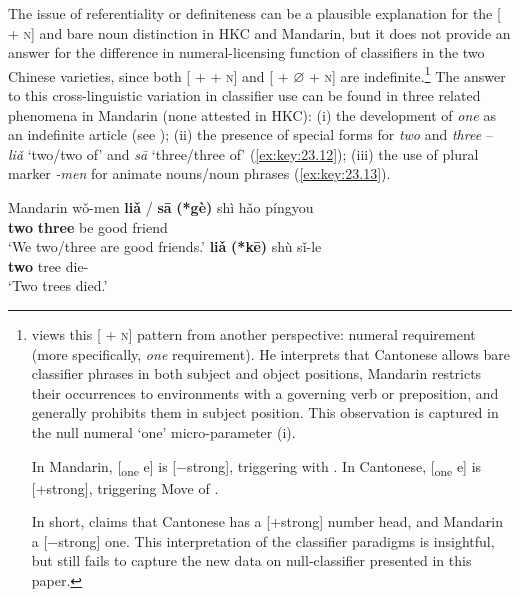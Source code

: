 \documentclass[output=paper]{langsci/langscibook}
\begin{document}
The issue of referentiality or definiteness can be a plausible explanation for
the [\Clf{} + \textsc{n}] and bare noun distinction in \gls{HKC} and Mandarin, but it
does not provide an answer for the difference in numeral-licensing function of
classifiers in the two Chinese varieties, since both [\Num{} + \Clf{} + \textsc{n}] and
[\Num{} + ${\varnothing}$ + \textsc{n}] are indefinite.\footnote{\citet{Huang2015} views
    this [\Clf{} + \textsc{n}] pattern from another perspective: numeral requirement
    (more specifically, \emph{one} requirement). He interprets that Cantonese
    allows bare classifier phrases in both subject and object positions,
    Mandarin restricts their occurrences to environments with a governing verb
    or preposition, and generally prohibits them in subject position. This
    observation is captured in the null numeral ‘one’ micro-parameter (i).

\begin{exe}
    \begin{xlist}
	\ex In Mandarin, [\textsubscript{one} e] is [−strong], triggering  with \Clf{}.
	\ex In Cantonese, [\textsubscript{one} e] is [+strong], triggering Move of \Clf{}.
    \end{xlist}
\end{exe}

In short, \citeauthor{Huang2015} claims that Cantonese has a [+strong] number
head, and Mandarin a [−strong] one. This interpretation of the classifier
paradigms is insightful, but still fails to capture the new data on
null-classifier  presented in this paper.} The answer to this
cross-linguistic variation in classifier use can be found in three related
phenomena in Mandarin (none attested in \gls{HKC}): (i) the development of
\emph{one} as an indefinite article (see ); (ii) the presence
of special forms for \emph{two} and \emph{three} -- \emph{liǎ} ‘two/two of’
and \emph{sā} ‘three/three of’ (\ref{ex:key:23.12}); (iii) the use of plural
marker \emph{-men} for animate nouns/noun phrases (\ref{ex:key:23.13}).

\ea\label{ex:key:23.12} Mandarin %
	\ea
        \gll    wǒ-men \textbf{liǎ} / \textbf{sā} \textbf{(*gè)} shì hǎo píngyou\\
                \Fpl{} \textbf{two} {} \textbf{three} \hphantom{\textbf{(*}}\textbf{\Clf{}} be good friend\\
	    \glt    ‘We two/three are good friends.’
	\ex
	    \gll    \textbf{liǎ} \textbf{(*kē)} shù sǐ-le\\
                \textbf{two} \hphantom{\textbf{*(}}\textbf{\Clf} tree die-\Pfv{}\\
	    \glt    ‘Two trees died.’
	\z
\z
\end{document}
